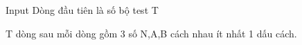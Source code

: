 Input
Dòng đầu tiên là số bộ test T  

   T dòng sau mỗi dòng gồm 3 số N,A,B cách nhau ít nhất 1 dấu cách.